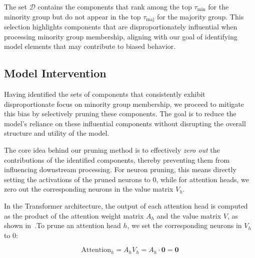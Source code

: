 The set $\mathcal{D}$ contains the components that rank among the top $\tau_{\mathrm{min}}$ for the minority group but do not appear in the top $\tau_{\mathrm{maj}}$ for the majority group. This selection highlights components that are disproportionately influential when processing minority group membership, aligning with our goal of identifying model elements that may contribute to biased behavior.


\subsection{Model Intervention}
\label{sec:model-editing}
Having identified the sets of components that consistently exhibit disproportionate focus on minority group membership, we proceed to mitigate this bias by selectively pruning these components. The goal is to reduce the model's reliance on these influential components without disrupting the overall structure and utility of the model.

The core idea behind our pruning method is to effectively \textit{zero out} the contributions of the identified components, thereby preventing them from influencing downstream processing. For neuron pruning, this means directly setting the activations of the pruned neurons to $0$, while for attention heads, we zero out the corresponding neurons in the value matrix $V_h$.


In the Transformer architecture, the output of each attention head is computed as the product of the attention weight matrix $A_h$ and the value matrix $V$, as shown in~.To prune an attention head $h$, we set the corresponding neurons in $V_h$ to $0$:



\begin{equation}
    \mathrm{Attention}_h = A_h V_h = A_h \cdot \mathbf{0} = \mathbf{0}
\end{equation}

